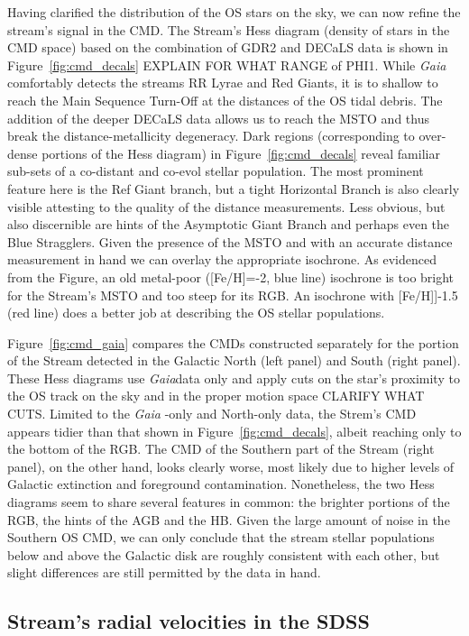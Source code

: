 \documentclass[a4paper,useAMS,usenatbib]{mnras}
\newcommand{\Gaia}{{\it Gaia}}
\newcommand{\gaia}{\textit{Gaia} }
\begin{document}
Having clarified the distribution of the OS stars on the sky, we can
now refine the stream's signal in the CMD. The Stream's Hess diagram
(density of stars in the CMD space) based on the combination of GDR2
and DECaLS data is shown in Figure~\ref{fig:cmd_decals} EXPLAIN FOR
WHAT RANGE of PHI1. While \gaia comfortably detects the streams RR
Lyrae and Red Giants, it is to shallow to reach the Main Sequence
Turn-Off at the distances of the OS tidal debris. The addition of the
deeper DECaLS data allows us to reach the MSTO and thus break the
distance-metallicity degeneracy. Dark regions (corresponding to
over-dense portions of the Hess diagram) in
Figure~\ref{fig:cmd_decals} reveal familiar sub-sets of a co-distant
and co-evol stellar population. The most prominent feature here is the
Ref Giant branch, but a tight Horizontal Branch is also clearly
visible attesting to the quality of the distance measurements. Less
obvious, but also discernible are hints of the Asymptotic Giant Branch
and perhaps even the Blue Stragglers. Given the presence of the MSTO
and with an accurate distance measurement in hand we can overlay the
appropriate isochrone. As evidenced from the Figure, an old metal-poor
([Fe/H]=-2, blue line) isochrone is too bright for the Stream's MSTO
and too steep for its RGB. An isochrone with [Fe/H]]-1.5 (red line)
  does a better job at describing the OS stellar populations.

Figure~\ref{fig:cmd_gaia} compares the CMDs constructed separately for
the portion of the Stream detected in the Galactic North (left panel)
and South (right panel). These Hess diagrams use \Gaia data only and
apply cuts on the star's proximity to the OS track on the sky and in
the proper motion space CLARIFY WHAT CUTS. Limited to the \gaia-only
and North-only data, the Strem's CMD appears tidier than that shown in
Figure~\ref{fig:cmd_decals}, albeit reaching only to the bottom of the
RGB. The CMD of the Southern part of the Stream (right panel), on the
other hand, looks clearly worse, most likely due to higher levels of
Galactic extinction and foreground contamination. Nonetheless, the two
Hess diagrams seem to share several features in common: the brighter
portions of the RGB, the hints of the AGB and the HB. Given the large
amount of noise in the Southern OS CMD, we can only conclude that the
stream stellar populations below and above the Galactic disk are
roughly consistent with each other, but slight differences are still
permitted by the data in hand.

\subsection{Stream's radial velocities in the SDSS}
\end{document}
